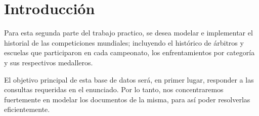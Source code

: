 \section{Introducci\'on}

Para esta segunda parte del trabajo practico, se desea modelar e implementar el historial de las competiciones mundiales; incluyendo el histórico de árbitros y escuelas que participaron en cada campeonato, los enfrentamientos por categoría y sus respectivos medalleros. 

El objetivo principal de esta base de datos ser\'a, en primer lugar, responder a las consultas requeridas en el enunciado. Por lo tanto, nos concentraremos fuertemente en modelar los documentos de la misma, para así poder resolverlas eficientemente.